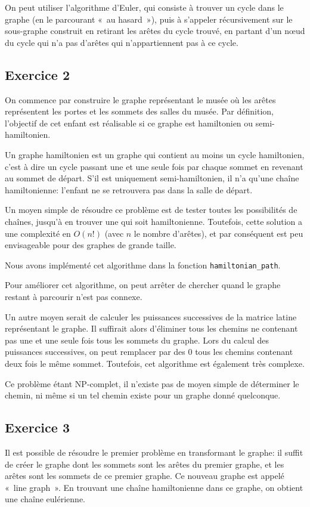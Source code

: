 \documentclass[draft]{scrartcl}
\begin{document}
    On peut utiliser l'algorithme d'Euler, qui consiste à trouver un cycle dans
    le graphe (en le parcourant «~au hasard~»), puis à s'appeler récursivement
    sur le sous-graphe construit en retirant les arêtes du cycle trouvé, en
    partant d'un nœud du cycle qui n'a pas d'arêtes qui n'appartiennent pas à
    ce cycle.

  \subsection{Exercice 2}
    On commence par construire le graphe représentant le musée où les arêtes
    représentent les portes et les sommets des salles du musée. Par définition,
    l'objectif de cet enfant est réalisable si ce graphe est hamiltonien ou
    semi-hamiltonien.

    Un graphe hamiltonien est un graphe qui contient au moins un cycle
    hamiltonien, c'est à dire un cycle passant une et une seule fois par chaque
    sommet en revenant au sommet de départ. S'il est uniquement
    semi-hamiltonien, il n'a qu'une chaîne hamiltonienne: l'enfant ne se
    retrouvera pas dans la salle de départ.

    Un moyen simple de résoudre ce problème est de tester toutes les
    possibilités de chaînes, jusqu'à en trouver une qui soit hamiltonienne.
    Toutefois, cette solution a une complexité en $O(n!)$ (avec $n$ le nombre
    d'arêtes), et par conséquent est peu envisageable pour des graphes de
    grande taille.

    Nous avons implémenté cet algorithme dans la fonction
    \verb+hamiltonian_path+.
    
    Pour améliorer cet algorithme, on peut arrêter de chercher
    quand le graphe restant à parcourir n'est pas connexe.

    Un autre moyen serait de calculer les puissances successives de la matrice
    latine représentant le graphe. Il suffirait alors d'éliminer tous les
    chemins ne contenant pas une et une seule fois tous les sommets du graphe.
    Lors du calcul des puissances successives, on peut remplacer par des 0 tous
    les chemins contenant deux fois le même sommet. Toutefois, cet algorithme
    est également très complexe.

    Ce problème étant NP-complet, il n'existe pas de moyen simple de déterminer
    le chemin, ni même si un tel chemin existe pour un graphe donné quelconque.

  \subsection{Exercice 3}
    Il est possible de résoudre le premier problème en transformant le graphe:
    il suffit de créer le graphe dont les sommets sont les arêtes du premier
    graphe, et les arêtes sont les sommets de ce premier graphe. Ce nouveau
    graphe est appelé «~line graph~». En trouvant une chaîne hamiltonienne
    dans ce graphe, on obtient une chaîne eulérienne.
\end{document}
